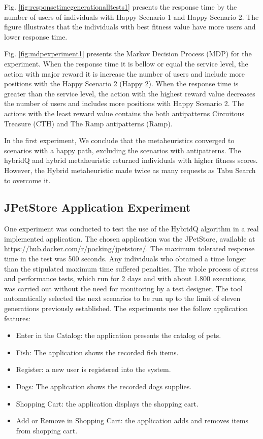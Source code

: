 \documentclass{bmcart}
\begin{document}
Fig. \ref{fig:responsetimegenerationalltests1} presents the response time by the number of users of individuals with Happy Scenario 1 and Happy Scenario 2. The figure illustrates that the individuals with best fitness value have more users and lower response time. 


Fig. \ref{fig:mdpexperiment1} presents the Markov Decision Process (MDP) for the experiment. When the response time it is bellow or equal the service level, the action with major reward it is increase the number of users and include more positions with the Happy Scenario 2 (Happy 2). When the response time is greater than the service level, the action with the highest reward value decreases the number of users and includes more positions with Happy Scenario 2. The actions with the least reward value contains the both antipatterns Circuitous Treasure (CTH) and The Ramp antipatterns (Ramp).

In the first experiment, We conclude that the metaheuristics converged to scenarios with a happy path, excluding the scenarios with antipatterns. The hybridQ and hybrid metaheuristic returned individuals with higher fitness scores. However, the Hybrid metaheuristic made twice as many requests as Tabu Search to overcome it. 



\subsection{JPetStore Application Experiment}

One experiment was conducted to test the use of the HybridQ algorithm in a real implemented application. The chosen application was the JPetStore, available at \url{https://hub.docker.com/r/pocking/jpetstore/}. The maximum tolerated response time in the test was 500 seconds.  Any  individuals who obtained a time longer than the stipulated maximum time suffered penalties.  The whole process of stress and performance tests, which run for 2 days and  with about 1.800 executions, was carried out without the need for monitoring by a test designer. The tool automatically selected the next scenarios to be run up to the limit of eleven generations previously established. The experiments use the follow application features:


\begin{itemize}
\item Enter in the Catalog: the application presents the catalog of pets.
\item Fish: The application shows the recorded fish items.
\item Register:  a new user is registered into the system.
\item Dogs: The application shows the recorded dogs supplies.
\item Shopping Cart: the application displays the shopping cart.
\item Add or Remove in Shopping Cart: the application adds and removes items from shopping cart.
\end{itemize}
\end{document}
